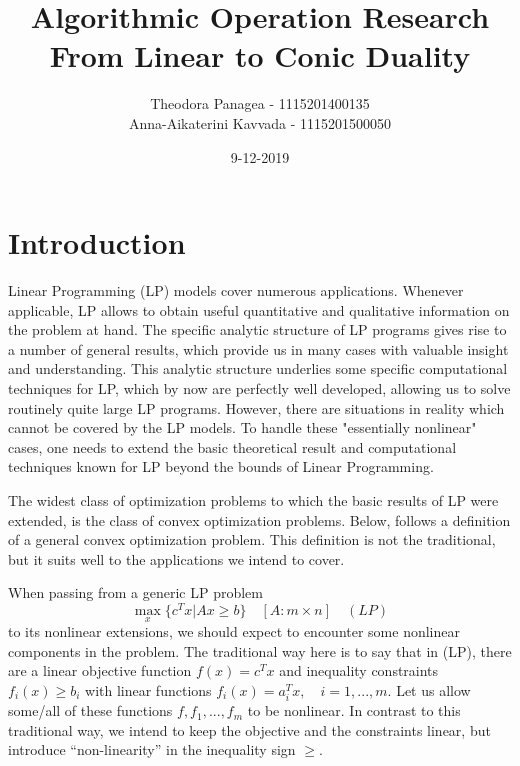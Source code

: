 \documentclass[12pt]{article}
\title{Algorithmic Operation Research \\ From Linear to Conic Duality}
\date{9-12-2019}
\author{Theodora Panagea - 1115201400135 \\ Anna-Aikaterini Kavvada - 1115201500050}
\begin{document}
	\maketitle{}
  	\tableofcontents
  	\newpage
  	\section{Introduction}
  	
  	\par Linear Programming (LP) models cover numerous applications. Whenever applicable, LP allows to obtain useful quantitative and qualitative information on the problem at hand. The specific analytic structure of LP programs gives rise to a number of general results, which provide us in many cases with valuable insight and understanding. This analytic structure underlies some specific computational techniques for LP, which by now are perfectly well developed, allowing us to solve routinely quite large LP programs. However, there are situations in reality which cannot be covered by the LP models. To handle these "essentially nonlinear" cases, one needs to extend the basic theoretical result and computational techniques known for LP beyond the bounds of Linear Programming.\par
  	The widest class of optimization problems to which the basic results of LP were extended, is the class of convex optimization problems. Below, follows a definition of a general convex optimization problem. This definition is not the traditional, but it suits well to the applications we intend to cover.\par 
  	When passing from a generic LP problem 
  	$$\max\limits_{x} \{ c^T x | Ax \geq b \} \quad [A: m \times n] \quad (LP)$$
  	to its nonlinear extensions, we should expect to encounter some nonlinear components in the
    problem. The traditional way here is to say that in (LP), there are a linear objective function $f(x) = c^T x$ and inequality constraints $f_i (x) \geq b_i$ with linear functions $f_i (x) = a_i^T x,\quad i = 1, ..., m$. Let us allow some/all of these functions $f, f_1 , ..., f_ m$ to be nonlinear. In contrast to this traditional way, we intend to keep the objective and the constraints linear, but introduce “non-linearity” in the inequality sign $\geq$.
    
\end{document}
